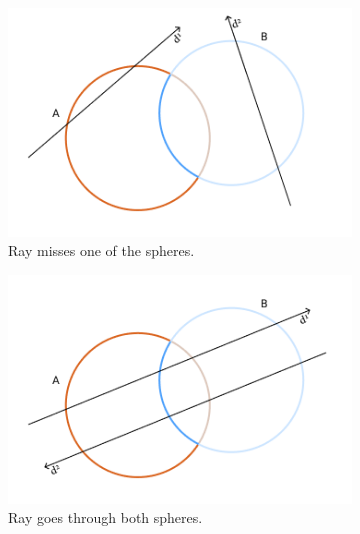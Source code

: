 \documentclass[a4paper,11pt,oneside]{article}
\begin{document}
\begin{figure}[ht]
     \centering
      \begin{subfigure}[b]{0.3\textwidth}
      	\centering
        \includegraphics[width=\textwidth]{section3/3.4/sphere_difference_case2.png}
        \caption{Ray misses one of the spheres.}
        \label{sec3.4:difference_case1}
     \end{subfigure}
     \hfill
     \begin{subfigure}[b]{0.3\textwidth}
         \centering
         \includegraphics[width=\textwidth]{section3/3.4/sphere_difference_case1.png}
         \caption{Ray goes through both spheres.}
         \label{sec3.4:difference_case2}
     \end{subfigure}
     \hfill
     \begin{subfigure}[b]{0.3\textwidth}
         \centering

\end{subfigure}
\end{figure}
\end{document}
